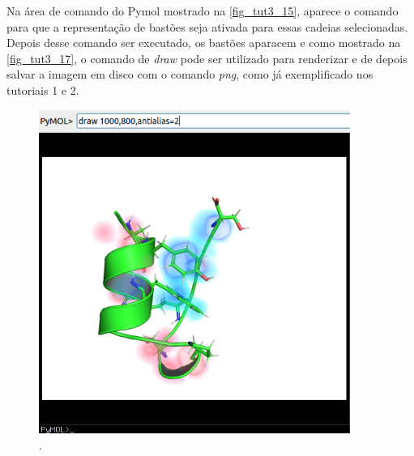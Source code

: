 \documentclass[a4paper,11pt]{refart}
\begin{document}
Na área de comando do Pymol mostrado na \autoref{fig_tut3_15}, aparece o comando para que a representação de bastões seja ativada para essas cadeias selecionadas. Depois desse comando ser executado, os bastões aparacem e como mostrado na \autoref{fig_tut3_17}, o comando de \emph{draw} pode ser utilizado para renderizar e de depois salvar a imagem em disco com o comando \emph{png}, como já exemplificado nos tutoriais 1 e 2. 


\hspace*{-\leftmarginwidth}
\begin{minipage}{\fullwidth}
	\begin{figure}[H]
		\begin{center}
			\includegraphics[width=4in]{images/tut3_img19}
			\caption{.}
			\label{fig_tut3_17}
		\end{center}
	\end{figure}
\end{minipage}
\end{document}

